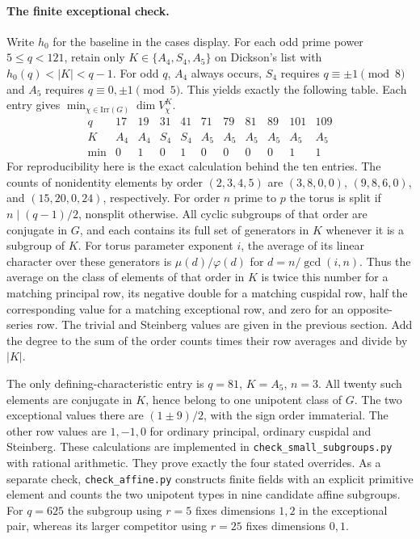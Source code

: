 \paragraph{The finite exceptional check.}
Write $h_0$ for the baseline in the cases display. For each odd prime power $5\le q<121$, retain only $K\in\{A_4,S_4,A_5\}$ on Dickson's list with $h_0(q)<|K|<q-1$. For odd $q$, $A_4$ always occurs, $S_4$ requires $q\equiv\pm1\pmod8$ and $A_5$ requires $q\equiv0,\pm1\pmod5$. This yields exactly the following table. Each entry gives $\min_{\chi\in\mathrm{Irr}(G)}\dim V_\chi^K$.
\[
\begin{array}{c|rrrrrrrrrr}
q&17&19&31&41&71&79&81&89&101&109\\\hline
K&A_4&A_4&S_4&S_4&A_5&A_5&A_5&A_5&A_5&A_5\\
\min&0&1&0&1&0&0&0&0&1&1
\end{array}
\]
For reproducibility here is the exact calculation behind the ten entries. The counts of nonidentity elements by order $(2,3,4,5)$ are $(3,8,0,0)$, $(9,8,6,0)$, and $(15,20,0,24)$, respectively. For order $n$ prime to $p$ the torus is split if $n\mid(q-1)/2$, nonsplit otherwise. All cyclic subgroups of that order are conjugate in $G$, and each contains its full set of generators in $K$ whenever it is a subgroup of $K$. For torus parameter exponent $i$, the average of its linear character over these generators is $\mu(d)/\varphi(d)$ for $d=n/\gcd(i,n)$. Thus the average on the class of elements of that order in $K$ is twice this number for a matching principal row, its negative double for a matching cuspidal row, half the corresponding value for a matching exceptional row, and zero for an opposite-series row. The trivial and Steinberg values are given in the previous section. Add the degree to the sum of the order counts times their row averages and divide by $|K|$.

The only defining-characteristic entry is $q=81$, $K=A_5$, $n=3$. All twenty such elements are conjugate in $K$, hence belong to one unipotent class of $G$. The two exceptional values there are $(1\pm9)/2$, with the sign order immaterial. The other row values are $1,-1,0$ for ordinary principal, ordinary cuspidal and Steinberg. These calculations are implemented in \texttt{check\_small\_subgroups.py} with rational arithmetic. They prove exactly the four stated overrides. As a separate check, \texttt{check\_affine.py} constructs finite fields with an explicit primitive element and counts the two unipotent types in nine candidate affine subgroups. For $q=625$ the subgroup using $r=5$ fixes dimensions $1,2$ in the exceptional pair, whereas its larger competitor using $r=25$ fixes dimensions $0,1$.

